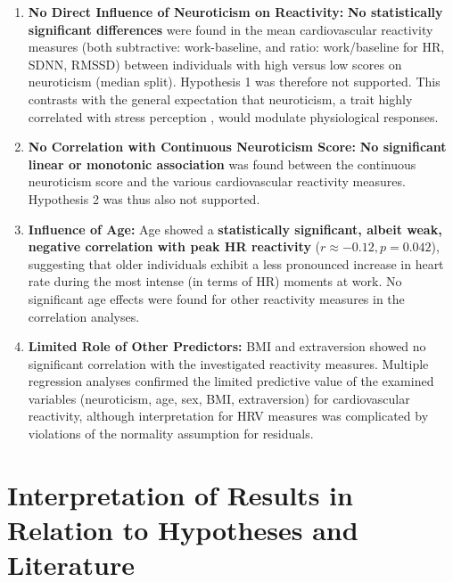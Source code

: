 \documentclass[11pt, a4paper]{report}
\begin{document}
\begin{enumerate}
    \item \textbf{No Direct Influence of Neuroticism on Reactivity:} \textbf{No statistically significant differences} were found in the mean cardiovascular reactivity measures (both subtractive: work-baseline, and ratio: work/baseline for HR, SDNN, RMSSD) between individuals with high versus low scores on neuroticism (median split). Hypothesis 1 was therefore not supported. This contrasts with the general expectation that neuroticism, a trait highly correlated with stress perception \cite{VerschoorMarkus2011}, would modulate physiological responses.
    \item \textbf{No Correlation with Continuous Neuroticism Score:} \textbf{No significant linear or monotonic association} was found between the continuous neuroticism score and the various cardiovascular reactivity measures. Hypothesis 2 was thus also not supported.
    \item \textbf{Influence of Age:} Age showed a \textbf{statistically significant, albeit weak, negative correlation with peak HR reactivity} ($r \approx -0.12, p = 0.042$), suggesting that older individuals exhibit a less pronounced increase in heart rate during the most intense (in terms of HR) moments at work. No significant age effects were found for other reactivity measures in the correlation analyses.
    \item \textbf{Limited Role of Other Predictors:} BMI and extraversion showed no significant correlation with the investigated reactivity measures. Multiple regression analyses confirmed the limited predictive value of the examined variables (neuroticism, age, sex, BMI, extraversion) for cardiovascular reactivity, although interpretation for HRV measures was complicated by violations of the normality assumption for residuals.
\end{enumerate}

\section{Interpretation of Results in Relation to Hypotheses and Literature}
\label{sec:discussion_interpretation_results} %
\end{document}
